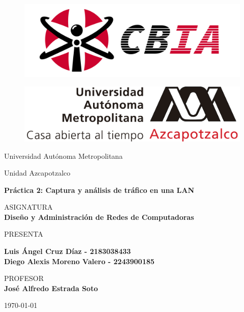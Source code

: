 
\begin{figure}[ht]
    \centering %
    \begin{minipage}{0.45\textwidth} %
        \includegraphics[width=\textwidth]{img/portada/CBI.png}
        \label{CBI}
    \end{minipage}\hfill %
    \begin{minipage}{0.45\textwidth}
        \includegraphics[width=\textwidth]{img/portada/UAM.png}
        \label{UAM}
    \end{minipage}
\end{figure}


\begin{center}
\vspace{0.8cm}
\LARGE
Universidad Autónoma Metropolitana

\vspace{0.8cm}
\LARGE
Unidad Azcapotzalco

\vspace{1.7cm}
\Large
\textbf{Práctica 2: Captura y análisis de tráfico en una LAN}

\vspace{1.3cm}
\normalsize	
ASIGNATURA \\
\vspace{.3cm}
\large
\textbf{Diseño y Administración de Redes de Computadoras}

\vspace{1.3cm}
\normalsize
PRESENTA \\
\vspace{.3cm}
\large

\textbf{Luis Ángel Cruz Díaz - 2183038433\\}
\textbf{Diego Alexis Moreno Valero - 2243900185}

\vspace{1.3cm}
\normalsize	
PROFESOR \\
\vspace{.3cm}
\large
\textbf{José Alfredo Estrada Soto}

\vspace{1.3cm}
\today
\end{center}

\thispagestyle{empty} 
\newpage